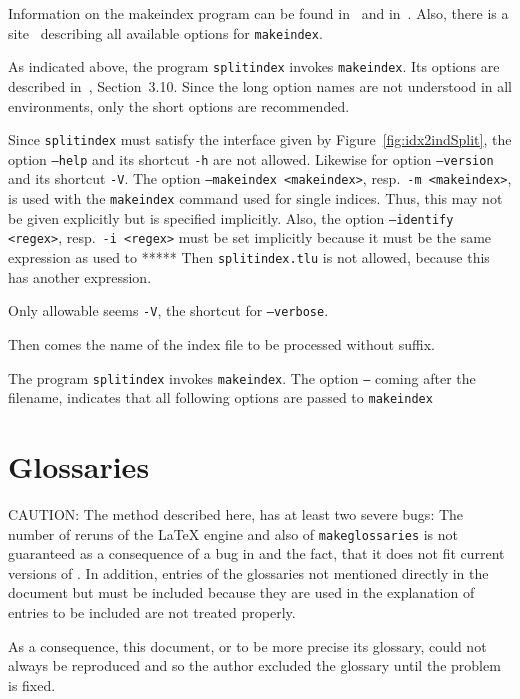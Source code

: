 Information on the makeindex program can be found in~\cite{MkIdxMoe} 
and in~\cite{MkIdxLam}. 
Also, there is a site~\cite{MakeIdxOpts} 
describing all available options for \texttt{makeindex}. 

As indicated above, the program \texttt{splitindex} 
invokes \texttt{makeindex}. 
Its options are described in~\cite{SplitidxP}, Section~3.10. 
Since the long option names are not understood in all environments, 
only the short options are recommended. 

Since \texttt{splitindex} must satisfy the interface 
given by Figure~\ref{fig:idx2indSplit}, 
the option \texttt{--help} and its shortcut \texttt{-h} are not allowed. 
Likewise for option \texttt{--version} and its shortcut \texttt{-V}. 
The option \texttt{--makeindex <makeindex>}, resp.~\texttt{-m <makeindex>}, 
is used with the \texttt{makeindex} command used for single indices. 
Thus, this may not be given explicitly but is specified implicitly. 
Also, the option \texttt{--identify <regex>}, resp.~\texttt{-i <regex>} 
must be set implicitly because it must be the same expression 
as used to ***** 
Then \texttt{splitindex.tlu} is not allowed, 
because this has another expression. 

Only allowable seems \texttt{-V}, the shortcut for \texttt{--verbose}. 

Then comes the name of the index file to be processed 
without suffix. 

The program \texttt{splitindex} invokes \texttt{makeindex}. 
The option \texttt{--} coming after the filename, 
indicates that all following options are passed to \texttt{makeindex} 



\section{Glossaries}\label{sec:glossaries}

CAUTION\@: The method described here, 
has at least two severe bugs: 
The number of reruns of the \LaTeX{} engine and also of \texttt{makeglossaries} 
is not guaranteed as a consequence of a bug in  
and the fact, that it does not fit current versions of . 
In addition, entries of the glossaries not mentioned directly in the document 
but must be included because they are used in the explanation of entries to be included 
are not treated properly. 

As a consequence, this document, or to be more precise its glossary, 
could not always be reproduced and so the author excluded the glossary until the problem is fixed. 

